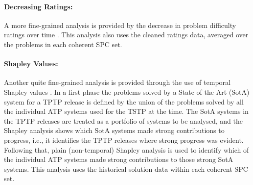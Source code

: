 \documentclass[runningheads]{llncs}
\begin{document}
\paragraph{Decreasing Ratings:}
A more fine-grained analysis is provided by the decrease in problem difficulty ratings over
time \cite{SFS01}.
This analysis also uses the cleaned ratings data, averaged over the problems in each coherent 
SPC set.

\paragraph{Shapley Values:}
Another quite fine-grained analysis is provided through the use of temporal Shapley values 
\cite{KF+19}.
In a first phase the problems solved by a State-of-the-Art (SotA) system for a TPTP release is 
defined by the union of the problems solved by all the individual ATP systems used for the TSTP 
at the time.
The SotA systems in the TPTP releases are treated as a portfolio of systems to be analysed, and 
the Shapley analysis shows which SotA systems made strong contributions to progress, i.e., it
identifies the TPTP releases where strong progress was evident.
Following that, plain (non-temporal) Shapley analysis \cite{FK+16} is used to identify which
of the individual ATP systems made strong contributions to those strong SotA systems.
This analysis uses the historical solution data within each coherent SPC set.
\end{document}

